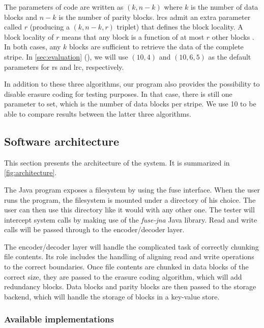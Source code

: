 The parameters of  code are written as $(k,n-k)$ where $k$ is the number of data blocks and $n-k$ is the number of parity blocks.
\acp{lrc} admit an extra parameter called $r$ (producing a $(k,n-k,r)$ triplet) that defines the block locality.
A block locality of $r$ means that any block is a function of at most $r$ other blocks \autocite{XorbasVLDB}.
In both cases, any $k$ blocks are sufficient to retrieve the data of the complete stripe.
In \autoref{sec:evaluation} (), we will use $(10,4)$ and $(10,6,5)$ as the default parameters for \ac{rs} and \ac{lrc}, respectively.

In addition to these three algorithms, our program also provides the possibility to disable erasure coding for testing purposes.
In that case, there is still one parameter to set, which is the number of data blocks per stripe.
We use 10 to be able to compare results between the latter three algorithms.

\subsection{Software architecture}
\label{subsec:architecture}

This section presents the architecture of the system.
It is summarized in \autoref{fig:architecture}.

The Java program exposes a filesystem by using the \ac{fuse} interface.
When the user runs the program, the filesystem is mounted under a directory of his choice.
The user can then use this directory like it would with any other one.
The tester will intercept system calls by making use of the \textit{fuse-jna} \autocite{fuse-jna} Java library.
Read and write calls will be passed through to the encoder/decoder layer.

The encoder/decoder layer will handle the complicated task of correctly chunking file contents.
Its role includes the handling of aligning read and write operations to the correct boundaries.
Once file contents are chunked in data blocks of the correct size, they are passed to the erasure coding algorithm, which will add redundancy blocks.
Data blocks and parity blocks are then passed to the storage backend, which will handle the storage of blocks in a key-value store.

\subsubsection{Available implementations}

